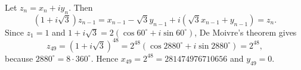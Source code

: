Let $z_n=x_n+iy_n$. Then
\[\left(1+i\sqrt3\right)z_{n-1}=x_{n-1}-\sqrt3y_{n-1}+i\left(\sqrt3x_{n-1}+y_{n-1}\right)=z_n.\]
Since $z_1=1$ and $1+i\sqrt3=2\left(\cos60^\circ+i\sin60^\circ\right)$, De Moivre's theorem gives
\[z_{49}=\left(1+i\sqrt3\right)^{48}=2^{48}\left(\cos2880^\circ+i\sin2880^\circ\right)=2^{48},\]
because $2880^\circ=8\cdot360^\circ$. Hence $x_{49}=\boxed{2^{48}=281474976710656}$ and $y_{49}=\boxed{0}$.
